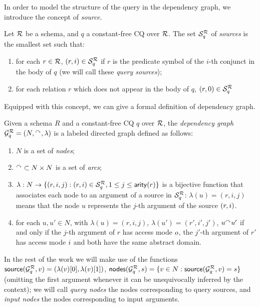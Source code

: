 In order to model the structure of the query in the dependency graph, we introduce the concept of \emph{source}.
%
\begin{definition}\label{def:source}
    Let $\mathcal{R}$ be a schema, and $q$ a constant-free CQ over $\mathcal{R}$. The set $\mathcal{S}_q^{\mathcal{R}}$ of \emph{sources} is the smallest set such that:
    \begin{enumerate}
        \item for each $r \in \mathcal{R}$, $(r, i) \in \mathcal{S}_q^{\mathcal{R}}$ if $r$ is the predicate symbol of the $i$-th conjunct in the body of $q$ (we will call these \emph{query sources});
        \item for each relation $r$ which does not appear in the body of $q$, $(r, 0) \in \mathcal{S}_q^{\mathcal{R}}$
    \end{enumerate}
\end{definition}
%
Equipped with this concept, we can give a formal definition of dependency graph.
%
\begin{definition}\label{def:dep-graph}
    Given a schema $R$ and a constant-free CQ $q$ over $\mathcal{R}$, the \emph{dependency graph} $\mathcal{G}_q^{\mathcal{R}} = (N, \mbox{$^{\curvearrowright}$}, \lambda)$ is a labeled directed graph defined as follows:
    \begin{enumerate}
        \item $N$ is a set of \emph{nodes};
        \item $\mbox{$^{\curvearrowright}$} \subset N \times N$ is a set of \emph{arcs};
        \item $\lambda: N \to \{ (r, i, j) : (r, i) \in \mathcal{S}_q^{\mathcal{R}}, 1 \leq j \leq \mathsf{arity}(r) \}$ is a bijective function that associates each node to an argument of a source in $\mathcal{S}_q^{\mathcal{R}}$: $\lambda(u) = (r, i, j)$ means that the node $u$ represents the $j$-th argument of the source $(r, i)$.
        \item for each $u, u' \in N$, with $\lambda(u) = (r, i, j)$, $\lambda(u') = (r', i', j')$, $u \mbox{$^{\curvearrowright}$} u'$ if and only if the $j$-th argument of $r$ has access mode $o$, the $j'$-th argument of $r'$ has access mode $i$ and both have the same abstract domain.
    \end{enumerate}
\end{definition}
%
In the rest of the work we will make use of the functions $\mbox{\textsf{source}}(\mathcal{G}_q^{\mathcal{R}},v) = (\lambda(v)[0], \lambda(v)[1])$, $\mbox{\textsf{nodes}}(\mathcal{G}_q^{\mathcal{R}}, s) = \{ v \in N : \mbox{\textsf{source}}(\mathcal{G}_q^{\mathcal{R}},v) = s \}$ (omitting the first argument whenever it can be unequivocally inferred by the context); we will call \emph{query nodes} the nodes corresponding to query sources, and \emph{input nodes} the nodes corresponding to input arguments.
%

